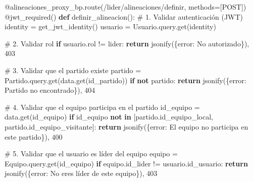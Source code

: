 \documentclass[
  spanish,
  11pt,
  letterpaper,
]{book}
\newenvironment{Shaded}{\begin{snugshade}}{\end{snugshade}}
\newcommand{\AttributeTok}[1]{\textcolor[rgb]{0.40,0.45,0.13}{#1}}
\newcommand{\CommentTok}[1]{\textcolor[rgb]{0.37,0.37,0.37}{#1}}
\newcommand{\ControlFlowTok}[1]{\textcolor[rgb]{0.00,0.23,0.31}{\textbf{#1}}}
\newcommand{\DecValTok}[1]{\textcolor[rgb]{0.68,0.00,0.00}{#1}}
\newcommand{\KeywordTok}[1]{\textcolor[rgb]{0.00,0.23,0.31}{\textbf{#1}}}
\newcommand{\NormalTok}[1]{\textcolor[rgb]{0.00,0.23,0.31}{#1}}
\newcommand{\OperatorTok}[1]{\textcolor[rgb]{0.37,0.37,0.37}{#1}}
\newcommand{\StringTok}[1]{\textcolor[rgb]{0.13,0.47,0.30}{#1}}
\begin{document}
\begin{Shaded}
\begin{Highlighting}[]
\AttributeTok{@alineaciones\_proxy\_bp.route}\NormalTok{(}\StringTok{\textquotesingle{}/lider/alineaciones/definir\textquotesingle{}}\NormalTok{, methods}\OperatorTok{=}\NormalTok{[}\StringTok{\textquotesingle{}POST\textquotesingle{}}\NormalTok{])}
\AttributeTok{@jwt\_required}\NormalTok{()}
\KeywordTok{def}\NormalTok{ definir\_alineacion():}
    \CommentTok{\# 1. Validar autenticación (JWT)}
\NormalTok{    identity }\OperatorTok{=}\NormalTok{ get\_jwt\_identity()}
\NormalTok{    usuario }\OperatorTok{=}\NormalTok{ Usuario.query.get(identity)}
    
    \CommentTok{\# 2. Validar rol}
    \ControlFlowTok{if}\NormalTok{ usuario.rol }\OperatorTok{!=} \StringTok{\textquotesingle{}lider\textquotesingle{}}\NormalTok{:}
        \ControlFlowTok{return}\NormalTok{ jsonify(\{}\StringTok{\textquotesingle{}error\textquotesingle{}}\NormalTok{: }\StringTok{\textquotesingle{}No autorizado\textquotesingle{}}\NormalTok{\}), }\DecValTok{403}
    
    \CommentTok{\# 3. Validar que el partido existe}
\NormalTok{    partido }\OperatorTok{=}\NormalTok{ Partido.query.get(data.get(}\StringTok{\textquotesingle{}id\_partido\textquotesingle{}}\NormalTok{))}
    \ControlFlowTok{if} \KeywordTok{not}\NormalTok{ partido:}
        \ControlFlowTok{return}\NormalTok{ jsonify(\{}\StringTok{\textquotesingle{}error\textquotesingle{}}\NormalTok{: }\StringTok{\textquotesingle{}Partido no encontrado\textquotesingle{}}\NormalTok{\}), }\DecValTok{404}
    
    \CommentTok{\# 4. Validar que el equipo participa en el partido}
\NormalTok{    id\_equipo }\OperatorTok{=}\NormalTok{ data.get(}\StringTok{\textquotesingle{}id\_equipo\textquotesingle{}}\NormalTok{)}
    \ControlFlowTok{if}\NormalTok{ id\_equipo }\KeywordTok{not} \KeywordTok{in}\NormalTok{ [partido.id\_equipo\_local, partido.id\_equipo\_visitante]:}
        \ControlFlowTok{return}\NormalTok{ jsonify(\{}\StringTok{\textquotesingle{}error\textquotesingle{}}\NormalTok{: }\StringTok{\textquotesingle{}El equipo no participa en este partido\textquotesingle{}}\NormalTok{\}), }\DecValTok{400}
    
    \CommentTok{\# 5. Validar que el usuario es líder del equipo}
\NormalTok{    equipo }\OperatorTok{=}\NormalTok{ Equipo.query.get(id\_equipo)}
    \ControlFlowTok{if}\NormalTok{ equipo.id\_lider }\OperatorTok{!=}\NormalTok{ usuario.id\_usuario:}
        \ControlFlowTok{return}\NormalTok{ jsonify(\{}\StringTok{\textquotesingle{}error\textquotesingle{}}\NormalTok{: }\StringTok{\textquotesingle{}No eres líder de este equipo\textquotesingle{}}\NormalTok{\}), }\DecValTok{403}
    

\end{Highlighting}
\end{Shaded}
\end{document}
